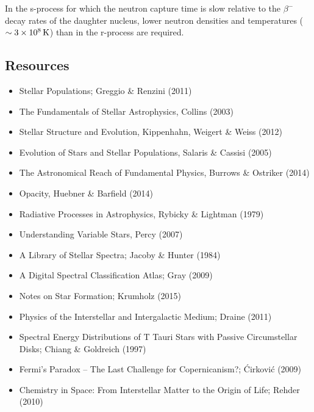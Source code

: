 \documentclass[a4paper,10pt]{article}
\begin{document}
{\noindent}In the s-process for which the neutron capture time is slow relative to the $\beta^-$ decay rates of the daughter nucleus, lower neutron densities and temperatures ($\sim3\times10^8\,{\rm K}$) than in the r-process are required.


\newpage
\subsection{Resources}

\begin{itemize}
    \item Stellar Populations; Greggio \& Renzini (2011)
    \item The Fundamentals of Stellar Astrophysics, Collins (2003)
    \item Stellar Structure and Evolution, Kippenhahn, Weigert \& Weiss (2012)
    \item Evolution of Stars and Stellar Populations, Salaris \& Cassisi (2005)
    \item The Astronomical Reach of Fundamental Physics, Burrows \& Ostriker (2014)
    \item Opacity, Huebner \& Barfield (2014)
    \item Radiative Processes in Astrophysics, Rybicky \& Lightman (1979)
    \item Understanding Variable Stars, Percy (2007)
    \item A Library of Stellar Spectra; Jacoby \& Hunter (1984)
    \item A Digital Spectral Classification Atlas; Gray (2009)
    \item Notes on Star Formation; Krumholz (2015)
    \item Physics of the Interstellar and Intergalactic Medium; Draine (2011)
    \item Spectral Energy Distributions of T Tauri Stars with Passive Circumstellar Disks; Chiang \& Goldreich (1997)
    \item Fermi’s Paradox -- The Last Challenge for Copernicanism?; \'Cirkovi\'c (2009)
    \item Chemistry in Space: From Interstellar Matter to the Origin of Life; Rehder (2010)
\end{itemize}
\end{document}

